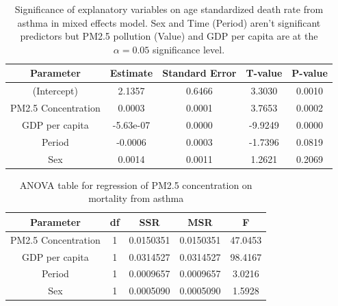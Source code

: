 \documentclass[12pt, letterpaper, twoside]{article}
\begin{document}
\begin{table}[h!]
\centering
\begin{tabular}{|c | c c c c|}
\toprule
Parameter & Estimate & Standard Error & T-value & P-value \\ [0.5ex]
\midrule
(Intercept) &	2.1357 &	0.6466 &	3.3030 &	0.0010 \\
PM2.5 Concentration &	0.0003 &	0.0001 &	3.7653 &	0.0002 \\
GDP per capita &	-5.63e-07	 &	0.0000 &	-9.9249 &	0.0000 \\
Period &	-0.0006 &	0.0003 &	-1.7396 &	0.0819 \\
Sex &	0.0014 &	0.0011 &	1.2621 &	0.2069 \\ [1ex]
\bottomrule
\end{tabular}
\label{tab:table1}
\caption{Significance of explanatory variables on age standardized death rate
  from asthma in mixed effects model. Sex and Time (Period) aren't significant
  predictors but PM2.5 pollution (Value) and GDP per capita are at the
  \begin{math}\alpha = 0.05\end{math} significance level.}
\end{table}

\begin{table}[h!]
\centering
\begin{tabular}{|c | c c c c|}
\toprule
Parameter & df & SSR & MSR & F \\ [0.5ex]
\midrule
PM2.5 Concentration & 1 & 0.0150351 & 0.0150351 & 47.0453 \\
GDP per capita & 1 & 0.0314527 & 0.0314527 & 98.4167 \\
Period & 1 & 0.0009657 & 0.0009657 & 3.0216 \\
Sex & 1 & 0.0005090 & 0.0005090 & 1.5928 \\ [1ex]
\bottomrule
\end{tabular}
\label{tab:table2}
\caption{ANOVA table for regression of PM2.5 concentration on mortality from
asthma}
\end{table}
\end{document}

